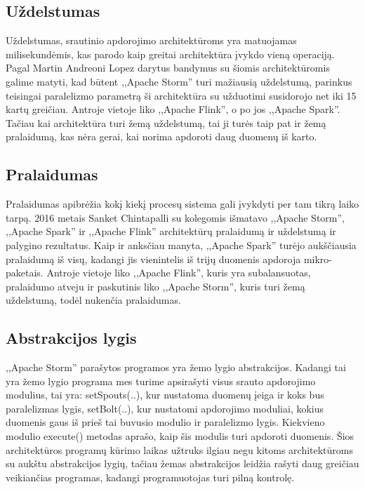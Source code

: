 \documentclass{VUMIFPSkursinis}
\begin{document}
\subsection{Uždelstumas}
    Uždelstumas, srautinio apdorojimo architektūroms yra matuojamas milisekundėmis, kas parodo kaip greitai architektūra įvykdo vieną operaciją. 
Pagal Martin Andreoni Lopez darytus bandymus su šiomis architektūromis galime matyti, kad būtent ,,Apache Storm'' turi mažiausią uždelstumą,
parinkus teisingai paralelizmo parametrą ši architektūra su užduotimi susidorojo net iki 15 kartų greičiau. Antroje vietoje liko ,,Apache Flink'', o po jos
,,Apache Spark''\cite{Lopez2016APC}. Tačiau kai architektūra turi žemą uždelstumą, tai ji turės taip pat ir žemą pralaidumą, kas nėra gerai, 
kai norima apdoroti daug duomenų iš karto.

\subsection{Pralaidumas}
    Pralaidumas apibrėžia kokį kiekį procesų sistema gali įvykdyti per tam tikrą laiko tarpą. 2016 metais Sanket Chintapalli su kolegomis išmatavo ,,Apache Storm'',
,,Apache Spark'' ir ,,Apache Flink'' architektūrų pralaidumą ir uždelstumą ir palygino rezultatus. Kaip ir anksčiau manyta, ,,Apache Spark'' turėjo aukščiausia 
pralaidumą iš visų, kadangi jis vienintelis iš trijų duomenis apdoroja mikro-paketais. Antroje vietoje liko ,,Apache Flink'', kuris yra subalansuotas,
pralaidumo atveju ir paskutinis liko ,,Apache Storm'', kuris turi žemą uždelstumą, todėl nukenčia pralaidumas\cite{chintapalli2016benchmarking}.
\subsection{Abstrakcijos lygis}

,,Apache Storm'' parašytos programos yra žemo lygio abstrakcijos. 
Kadangi tai yra žemo lygio programa mes turime apsirašyti visus srauto apdorojimo modulius, 
tai yra: setSpouts(..), kur nustatoma duomenų įeiga ir koks bus paralelizmas lygis, setBolt(..), kur nustatomi apdorojimo moduliai,
 kokius duomenis gaus iš prieš tai buvusio modulio ir paralelizmo lygis. Kiekvieno modulio execute() metodas aprašo, kaip šis modulis 
 turi apdoroti duomenis\cite{tutpoint}. Šios architektūros programų kūrimo laikas užtruks ilgiau negu kitoms architektūroms su aukštu abstrakcijos lygių,
 tačiau žemas abstrakcijos leidžia rašyti daug greičiau veikiančias programas, kadangi programuotojas turi pilną kontrolę.
\end{document}
